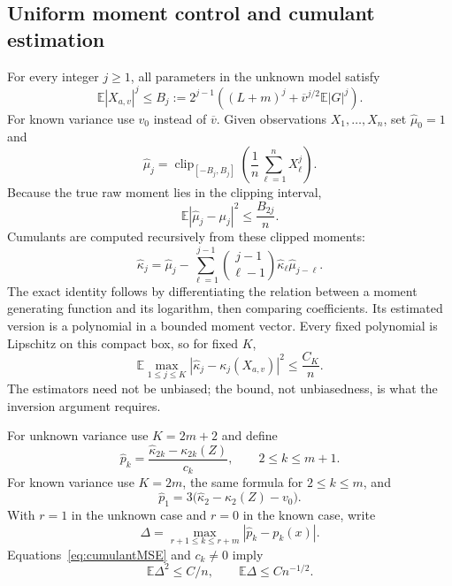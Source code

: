 \documentclass[11pt,a4paper]{article}
\numberwithin{equation}{section}
\theoremstyle{definition}
\theoremstyle{remark}
\newcommand{\E}{\mathbb E}
\newcommand{\clip}{\operatorname{clip}}
\newcommand{\kap}{\kappa}
\begin{document}
\subsection{Uniform moment control and cumulant estimation}
For every integer $j\ge1$, all parameters in the unknown model satisfy
\begin{equation}
 \E|X_{a,v}|^j\le B_j
 :=2^{j-1}\left((L+m)^j+\overline v^{j/2}\E|G|^j\right).
 \label{eq:Bj}
\end{equation}
For known variance use $v_0$ instead of $\overline v$. Given observations
$X_1,\ldots,X_n$, set $\widehat\mu_0=1$ and
\begin{equation}
 \widehat\mu_j=
 \clip_{[-B_j,B_j]}\left(\frac1n\sum_{\ell=1}^n X_\ell^j\right).
 \label{eq:rawestimator}
\end{equation}
Because the true raw moment lies in the clipping interval,
\begin{equation}
 \E|\widehat\mu_j-\mu_j|^2\le\frac{B_{2j}}{n}.
 \label{eq:rawMSE}
\end{equation}
Cumulants are computed recursively from these clipped moments:
\begin{equation}
 \widehat\kap_j=\widehat\mu_j-
 \sum_{\ell=1}^{j-1}\binom{j-1}{\ell-1}
                \widehat\kap_\ell\widehat\mu_{j-\ell}.
 \label{eq:cumulantrecursion}
\end{equation}
The exact identity follows by differentiating the relation between a moment
generating function and its logarithm, then comparing coefficients. Its
estimated version is a polynomial in a bounded moment vector. Every fixed
polynomial is Lipschitz on this compact box, so for fixed $K$,
\begin{equation}
 \E\max_{1\le j\le K}|\widehat\kap_j-\kap_j(X_{a,v})|^2\le\frac{C_K}{n}.
 \label{eq:cumulantMSE}
\end{equation}
The estimators need not be unbiased; the bound, not unbiasedness, is what the
inversion argument requires.

For unknown variance use $K=2m+2$ and define
\begin{equation}
 \widehat p_k=\frac{\widehat\kap_{2k}-\kap_{2k}(Z)}{c_k},
 \qquad 2\le k\le m+1.
 \label{eq:phatunknown}
\end{equation}
For known variance use $K=2m$, the same formula for $2\le k\le m$, and
\begin{equation}
 \widehat p_1=3\bigl(\widehat\kap_2-\kap_2(Z)-v_0\bigr).
 \label{eq:phatknown}
\end{equation}
With $r=1$ in the unknown case and $r=0$ in the known case, write
\begin{equation}
 \Delta=\max_{r+1\le k\le r+m}|\widehat p_k-p_k(x)|.
\end{equation}
Equations~\eqref{eq:cumulantMSE} and $c_k\ne0$ imply
\begin{equation}
 \E\Delta^2\le C/n,\qquad \E\Delta\le Cn^{-1/2}.
 \label{eq:delta}
\end{equation}
\end{document}
